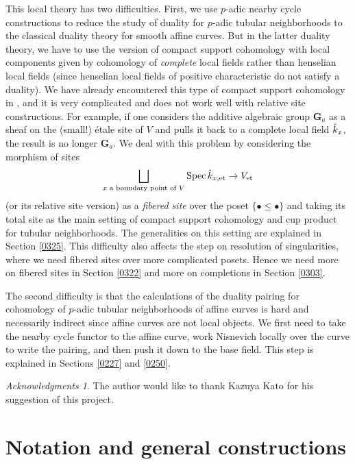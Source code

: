 \documentclass{amsart}
\theoremstyle{remark}
\newtheorem*{Ack}{Acknowledgments}
\numberwithin{equation}{subsection}
\newcommand{\et}{\mathrm{et}}
\newcommand{\Ga}{\mathbf{G}_{a}}
\DeclareMathOperator{\Spec}{Spec}
\begin{document}
This local theory has two difficulties.
First, we use $p$-adic nearby cycle constructions
to reduce the study of duality for $p$-adic tubular neighborhoods
to the classical duality theory for smooth affine curves.
But in the latter duality theory, we have to use the version of compact support cohomology
with local components given by cohomology of \emph{complete} local fields
rather than henselian local fields
(since henselian local fields of positive characteristic do not satisfy a duality).
We have already encountered this type of compact support cohomology in \cite{SuzCurve},
and it is very complicated and does not work well with relative site constructions.
For example, if one considers the additive algebraic group $\Ga$
as a sheaf on the (small!) \'etale site of $V$
and pulls it back to a complete local field $\Hat{k}_{x}$,
the result is no longer $\Ga$.
We deal with this problem by considering the morphism of sites
	\[
			\bigsqcup_{x \text{ a boundary point of } V}
				\Spec \Hat{k}_{x, \et}
		\to
			V_{\et}
	\]
(or its relative site version) as a \emph{fibered site} over the poset $\{\bullet \le \bullet\}$
and taking its total site as the main setting of compact support cohomology and cup product
for tubular neighborhoods.
The generalities on this setting are explained in Section \ref{0325}.
This difficulty also affects the step on resolution of singularities,
where we need fibered sites over more complicated posets.
Hence we need more on fibered sites in Section \ref{0322}
and more on completions in Section \ref{0303}.

The second difficulty is that the calculations of the duality pairing
for cohomology of $p$-adic tubular neighborhoods of affine curves is hard and necessarily indirect
since affine curves are not local objects.
We first need to take the nearby cycle functor to the affine curve,
work Nisnevich locally over the curve to write the pairing,
and then push it down to the base field.
This step is explained in Sections \ref{0227} and \ref{0250}.

\begin{Ack}
	The author would like to thank Kazuya Kato for his suggestion of this project.
\end{Ack}


\section{Notation and general constructions}
\label{0475}
\end{document}
